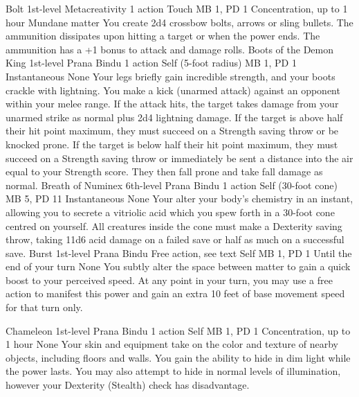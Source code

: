 \DndPowerHeader%
    {Bolt\label{pwr:bolt}}
    {1st-level Metacreativity}
    {1 action}
    {Touch}
    {MB 1, PD 1}
    {Concentration, up to 1 hour}
    {Mundane matter}
You create 2d4 crossbow bolts, arrows or
sling bullets. The ammunition dissipates upon hitting a target
or when the power ends. The ammunition has a +1 bonus to attack
and damage rolls.
\DndPowerHeader%
    {Boots of the Demon King\label{pwr:boots_of_the_demon_king}}
    {1st-level Prana Bindu}
    {1 action}
    {Self (5-foot radius)}
    {MB 1, PD 1}
    {Instantaneous}
    {None}
Your legs briefly gain incredible strength,
and your boots crackle with lightning. You make a kick (unarmed
attack) against an opponent within your melee range. If the
attack hits, the target takes damage from your unarmed strike
as normal plus 2d4 lightning damage. If the target is above
half their hit point maximum, they must succeed on a Strength
saving throw or be knocked prone. If the target is below half
their hit point maximum, they must succeed on a Strength saving
throw or immediately be sent a distance into the air equal
to your Strength score. They then fall prone and take fall
damage as normal.
\DndPowerHeader%
    {Breath of Numinex\label{pwr:breath_of_numinex}}
    {6th-level Prana Bindu}
    {1 action}
    {Self (30-foot cone)}
    {MB 5, PD 11}
    {Instantaneous}
    {None}
Your alter your body's chemistry in an instant,
allowing you to secrete a vitriolic acid which you spew forth
in a 30-foot cone centred on yourself. All creatures inside
the cone must make a Dexterity saving throw, taking 11d6 acid
damage on a failed save or half as much on a successful save.
\DndPowerHeader%
    {Burst\label{pwr:burst}}
    {1st-level Prana Bindu}
    {Free action, see text}
    {Self}
    {MB 1, PD 1}
    {Until the end of your turn}
    {None}
You subtly alter the space between matter
to gain a quick boost to your perceived speed. At any point
in your turn, you may use a free action to manifest this power
and gain an extra 10 feet of base movement speed for that
turn only.

\DndPowerHeader%
    {Chameleon\label{pwr:chameleon}}
    {1st-level Prana Bindu}
    {1 action}
    {Self}
    {MB 1, PD 1}
    {Concentration, up to 1 hour}
    {None}
Your skin and equipment take on the color
and texture of nearby objects, including floors and walls.
You gain the ability to hide in dim light while the power
lasts. You may also attempt to hide in normal levels of illumination,
however your Dexterity (Stealth) check has disadvantage.

